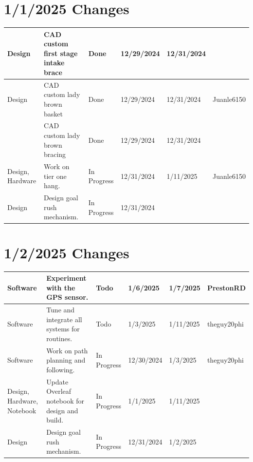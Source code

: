 \section{1/1/2025 Changes}
\begin{center}
\begin{longtable}{| p{40pt} | p{150pt} | p{35pt} | p{33pt} | p{33pt} | p{40pt} |}
\hline \rowcolor{DarkSeaGreen1}
Design & CAD custom first stage intake brace & Done & 12/29/2024 & 12/31/2024 & \\
\hline \rowcolor{DarkSeaGreen1}
Design & CAD custom lady brown basket & Done & 12/29/2024 & 12/31/2024 & Juanle6150 \\
\hline \rowcolor{DarkSeaGreen1}
& CAD custom lady brown bracing & Done & 12/29/2024 & 12/31/2024 & \\
\hline \rowcolor{LightGoldenrod1}
Design, Hardware & Work on tier one hang. & In Progress & 12/31/2024 & 1/11/2025 & Juanle6150 \\
\hline \rowcolor{LightGoldenrod1}
Design & Design goal rush mechanism. & In Progress & 12/31/2024 &  & \\
\hline
\end{longtable}
\end{center}


\section{1/2/2025 Changes}
\begin{center}
\begin{longtable}{| p{40pt} | p{150pt} | p{35pt} | p{33pt} | p{33pt} | p{40pt} |}
\hline \rowcolor{IndianRed1}
Software & Experiment with the GPS sensor. & Todo & 1/6/2025 & 1/7/2025 & PrestonRD \\
\hline \rowcolor{IndianRed1}
Software & Tune and integrate all systems for routines. & Todo & 1/3/2025 & 1/11/2025 & theguy20phi \\
\hline \rowcolor{LightGoldenrod1}
Software & Work on path planning and following. & In Progress & 12/30/2024 & 1/3/2025 & theguy20phi \\
\hline \rowcolor{LightGoldenrod1}
Design, Hardware, Notebook & Update Overleaf notebook for design and build. & In Progress & 1/1/2025 & 1/11/2025 & \\
\hline \rowcolor{LightGoldenrod1}
Design & Design goal rush mechanism. & In Progress & 12/31/2024 & 1/2/2025 & \\
\hline
\end{longtable}
\end{center}


